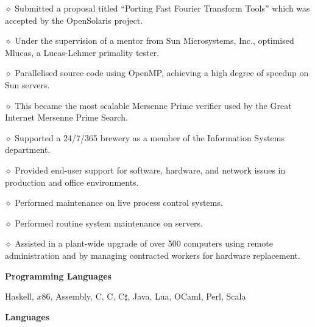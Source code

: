 \parindent=20pt
\item{$\diamond$} Submitted a proposal titled “Porting Fast Fourier
Transform Tools” which was accepted by the OpenSolaris project. 
\item{$\diamond$} Under the supervision of a mentor from Sun Microsystems,
Inc., optimised Mlucas, a Lucas-Lehmer primality
tester. 
\item{$\diamond$} Parallelised source code using OpenMP, achieving a high degree
of speedup on Sun servers.  
\item{$\diamond$} This became the most scalable Mersenne
Prime verifier used by the Great Internet Mersenne Prime Search.
\parindent=0pt

\bigskip

\medskip

\parindent=20pt
\item{$\diamond$} Supported a 24/7/365 brewery as a member of the
Information Systems department.  
\item{$\diamond$} Provided end-user support for software, hardware, and
network issues in production and office environments.  
\item{$\diamond$} Performed maintenance on live process control systems. 
\item{$\diamond$} Performed routine system maintenance on servers.  
\item{$\diamond$} Assisted in a plant-wide upgrade of
over 500 computers using remote administration and by managing
contracted workers for hardware replacement.
\parindent=0pt

\bigskip


{\bf Programming Languages} 

Haskell, $x$86, Assembly, C, C\plusplus, C$\sharp$, Java,
Lua, OCaml, Perl, Scala
\parindent=0pt
\medskip





{\bf Languages}

